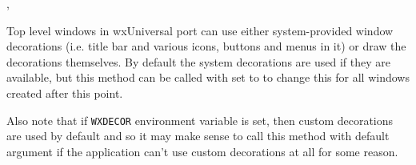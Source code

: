 
,\\


\label{wxtoplevelwindowusenativedecorationsbydefault}



Top level windows in wxUniversal port can use either system-provided window
decorations (i.e. title bar and various icons, buttons and menus in it) or draw
the decorations themselves. By default the system decorations are used if they
are available, but this method can be called with  set to \false to
change this for all windows created after this point.

Also note that if \texttt{WXDECOR} environment variable is set, then custom
decorations are used by default and so it may make sense to call this method
with default argument if the application can't use custom decorations at all
for some reason.



